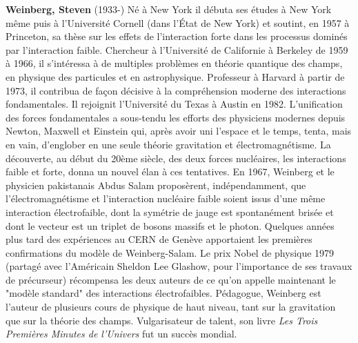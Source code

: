 \textbf{Weinberg, Steven} (1933-) Né à New York il débuta ses études à New York même puis à l'Université Cornell (dans l'État de New York) et soutint, en 1957 à Princeton, sa thèse sur les effets de l'interaction forte dans les processus dominés par l'interaction faible. Chercheur à l'Université de Californie à Berkeley de 1959 à 1966, il s'intéressa à de multiples problèmes en théorie quantique des champs, en physique des particules et en astrophysique. Professeur à Harvard à partir de 1973, il contribua de façon décisive à la compréhension moderne des interactions fondamentales. Il rejoignit l'Université du Texas à Austin en 1982. L'unification des forces fondamentales a sous-tendu les efforts des physiciens modernes depuis Newton, Maxwell et Einstein qui, après avoir uni l'espace et le temps, tenta, mais en vain, d'englober en une seule théorie gravitation et électromagnétisme. La découverte, au début du 20ème siècle, des deux forces nucléaires, les interactions faible et forte, donna un nouvel élan à ces tentatives. En 1967, Weinberg et le physicien pakistanais Abdus Salam proposèrent, indépendamment, que l'électromagnétisme et l'interaction nucléaire faible soient issus d'une même interaction électrofaible, dont la symétrie de jauge est spontanément brisée et dont le vecteur est un triplet de bosons massifs et le photon. Quelques années plus tard des expériences au CERN de Genève apportaient les premières confirmations du modèle de Weinberg-Salam. Le prix Nobel de physique 1979 (partagé avec l'Américain Sheldon Lee Glashow, pour l'importance de ses travaux de précurseur) récompensa les deux auteurs de ce qu'on appelle maintenant le "modèle standard" des interactions électrofaibles. Pédagogue, Weinberg est l'auteur de plusieurs cours de physique de haut niveau, tant sur la gravitation que sur la théorie des champs. Vulgarisateur de talent, son livre\textit{ Les Trois Premières Minutes de l'Univers} fut un succès mondial.

